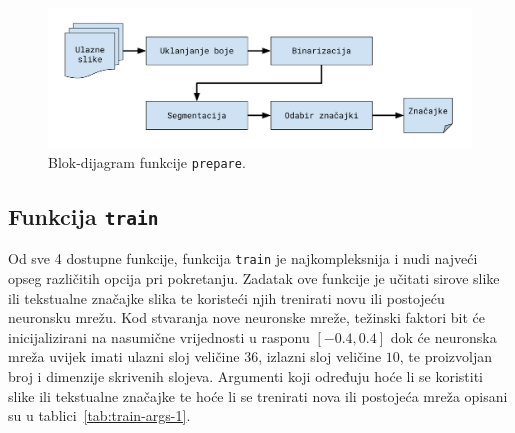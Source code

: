 \begin{figure}[htb]
    \centering
    \includegraphics[width=12cm]{images/chapter4/prepare-diagram.pdf}
    \caption{Blok-dijagram funkcije \texttt{prepare}.}
    \label{fig:prepare-diagram}
\end{figure}

\subsection{Funkcija \texttt{train}}
\label{subsec:funkcija-train}
Od sve 4 dostupne funkcije, funkcija \texttt{train} je najkompleksnija i nudi najveći opseg različitih opcija pri
pokretanju. Zadatak ove funkcije je učitati sirove slike ili tekstualne značajke slika te koristeći njih trenirati
novu ili postojeću neuronsku mrežu. Kod stvaranja nove neuronske mreže, težinski faktori bit će inicijalizirani na
nasumične vrijednosti u rasponu $[-0.4, 0.4]$ dok će neuronska mreža uvijek imati ulazni sloj veličine $36$, izlazni
sloj veličine $10$, te proizvoljan broj i dimenzije skrivenih slojeva. Argumenti koji određuju hoće li se koristiti
slike ili tekstualne značajke te hoće li se trenirati nova ili postojeća mreža opisani su u
tablici\ \ref{tab:train-args-1}.
